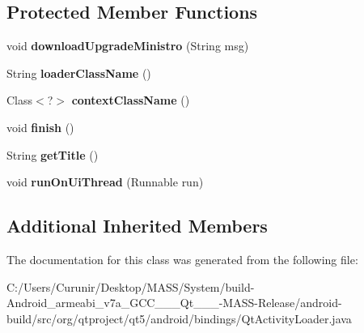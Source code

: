 \subsection*{Protected Member Functions}
\begin{DoxyCompactItemize}
\item 
\mbox{\label{classorg_1_1qtproject_1_1qt5_1_1android_1_1bindings_1_1_qt_activity_loader_a24d6d47ff7caf9ecfd9353335a057583}} 
void {\bfseries download\+Upgrade\+Ministro} (String msg)
\item 
\mbox{\label{classorg_1_1qtproject_1_1qt5_1_1android_1_1bindings_1_1_qt_activity_loader_a075dfba5e6150aecb7ec1f39cc155679}} 
String {\bfseries loader\+Class\+Name} ()
\item 
\mbox{\label{classorg_1_1qtproject_1_1qt5_1_1android_1_1bindings_1_1_qt_activity_loader_afc6669238867a215131b4d8cb0b2c61a}} 
Class$<$?$>$ {\bfseries context\+Class\+Name} ()
\item 
\mbox{\label{classorg_1_1qtproject_1_1qt5_1_1android_1_1bindings_1_1_qt_activity_loader_a151c3ac65df220ddf72ebfa90ddaef5c}} 
void {\bfseries finish} ()
\item 
\mbox{\label{classorg_1_1qtproject_1_1qt5_1_1android_1_1bindings_1_1_qt_activity_loader_ad662e2c8945a912d3d06a11231b0c384}} 
String {\bfseries get\+Title} ()
\item 
\mbox{\label{classorg_1_1qtproject_1_1qt5_1_1android_1_1bindings_1_1_qt_activity_loader_ad25ae145345c229f723fd93e8e351975}} 
void {\bfseries run\+On\+Ui\+Thread} (Runnable run)
\end{DoxyCompactItemize}
\subsection*{Additional Inherited Members}


The documentation for this class was generated from the following file\+:\begin{DoxyCompactItemize}
\item 
C\+:/\+Users/\+Curunir/\+Desktop/\+M\+A\+S\+S/\+System/build-\/\+Android\+\_\+armeabi\+\_\+v7a\+\_\+\+G\+C\+C\+\_\+\_\+\_\+\+Qt\+\_\+\_\+\_-\/\+M\+A\+S\+S-\/\+Release/android-\/build/src/org/qtproject/qt5/android/bindings/Qt\+Activity\+Loader.\+java\end{DoxyCompactItemize}
